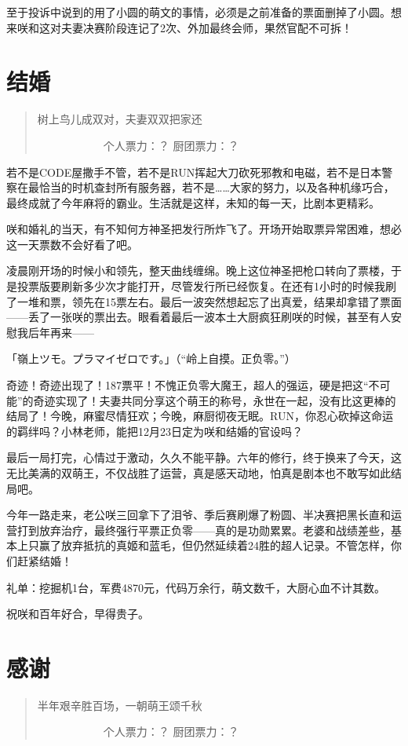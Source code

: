 至于投诉中说到的用了小圆的萌文的事情，必须是之前准备的票面删掉了小圆。想来咲和这对夫妻决赛阶段连记了2次、外加最终会师，果然官配不可拆！


\section{结婚}
\begin{quote}
树上鸟儿成双对，夫妻双双把家还

　　　　　　个人票力：？ 厨团票力：？
\end{quote}

若不是CODE屋撒手不管，若不是RUN挥起大刀砍死邪教和电磁，若不是日本警察在最恰当的时机查封所有服务器，若不是……大家的努力，以及各种机缘巧合，最终成就了今年麻将的霸业。生活就是这样，未知的每一天，比剧本更精彩。

咲和婚礼的当天，有不知何方神圣把发行所炸飞了。开场开始取票异常困难，想必这一天票数不会好看了吧。

凌晨刚开场的时候小和领先，整天曲线缠绵。晚上这位神圣把枪口转向了票楼，于是投票版要刷新多少次才能打开，尽管发行所已经恢复。在还有1小时的时候我刷了一堆和票，领先在15票左右。最后一波突然想起忘了出真爱，结果却拿错了票面——丢了一张咲的票出去。眼看着最后一波本土大厨疯狂刷咲的时候，甚至有人安慰我后年再来——

「嶺上ツモ。プラマイゼロです。」（“岭上自摸。正负零。”）

奇迹！奇迹出现了！187票平！不愧正负零大魔王，超人的强运，硬是把这“不可能”的奇迹实现了！夫妻共同分享这个萌王的称号，永世在一起，没有比这更棒的结局了！今晚，麻蜜尽情狂欢；今晚，麻厨彻夜无眠。RUN，你忍心砍掉这命运的羁绊吗？小林老师，能把12月23日定为咲和结婚的官设吗？

最后一局打完，心情过于激动，久久不能平静。六年的修行，终于换来了今天，这无比美满的双萌王，不仅战胜了运营，真是感天动地，怕真是剧本也不敢写如此结局吧。

今年一路走来，老公咲三回拿下了泪爷、季后赛刷爆了粉圆、半决赛把黑长直和运营打到放弃治疗，最终强行平票正负零——真的是功勋累累。老婆和战绩差些，基本上只赢了放弃抵抗的真姬和蓝毛，但仍然延续着24胜的超人记录。不管怎样，你们赶紧结婚！

礼单：挖掘机1台，军费4870元，代码万余行，萌文数千，大厨心血不计其数。

祝咲和百年好合，早得贵子。


\section{感谢}
\begin{quote}
半年艰辛胜百场，一朝萌王颂千秋

　　　　　　个人票力：？ 厨团票力：？
\end{quote}

